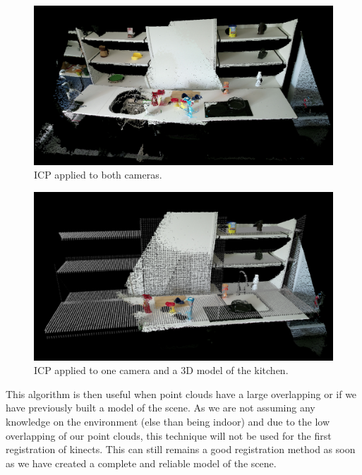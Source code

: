 \begin{figure}[h!]
    \centering
    \includegraphics[width=\textwidth]{images/icp_one_one_registration.png}
    \caption{ICP applied to both cameras.}
    \label{fig:icp_cams}
\end{figure}

\begin{figure}[h!]
    \centering
    \includegraphics[width=\textwidth]{images/icp_model.png}
    \caption{ICP applied to one camera and a 3D model of the kitchen.}
    \label{fig:icp_model}
\end{figure}

This algorithm is then useful when point clouds have a large overlapping or if we have previously built a model of the scene. As we are not assuming any knowledge on the environment (else than being indoor) and due to the low overlapping of our point clouds, this technique will not be used for the first registration of kinects. This can still remains a good registration method as soon as we have created a complete and reliable model of the scene.

